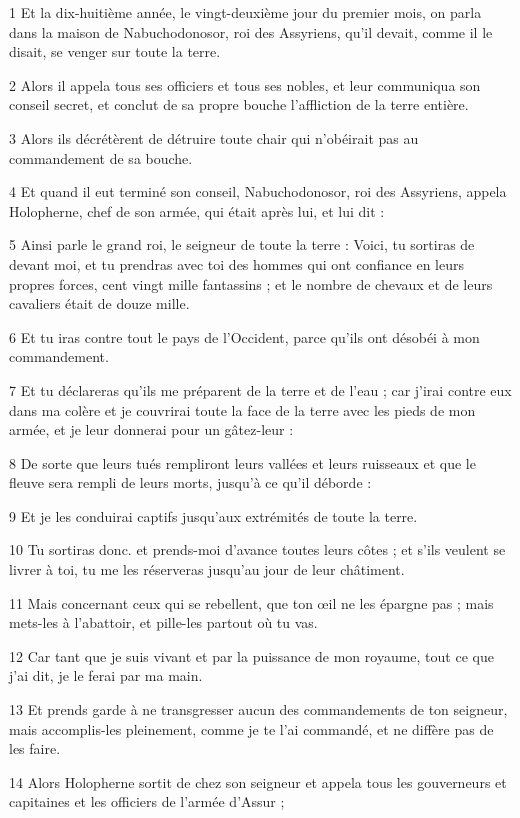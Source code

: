 \par 1 Et la dix-huitième année, le vingt-deuxième jour du premier mois, on parla dans la maison de Nabuchodonosor, roi des Assyriens, qu'il devait, comme il le disait, se venger sur toute la terre.
\par 2 Alors il appela tous ses officiers et tous ses nobles, et leur communiqua son conseil secret, et conclut de sa propre bouche l'affliction de la terre entière.
\par 3 Alors ils décrétèrent de détruire toute chair qui n'obéirait pas au commandement de sa bouche.
\par 4 Et quand il eut terminé son conseil, Nabuchodonosor, roi des Assyriens, appela Holopherne, chef de son armée, qui était après lui, et lui dit :
\par 5 Ainsi parle le grand roi, le seigneur de toute la terre : Voici, tu sortiras de devant moi, et tu prendras avec toi des hommes qui ont confiance en leurs propres forces, cent vingt mille fantassins ; et le nombre de chevaux et de leurs cavaliers était de douze mille.
\par 6 Et tu iras contre tout le pays de l'Occident, parce qu'ils ont désobéi à mon commandement.
\par 7 Et tu déclareras qu'ils me préparent de la terre et de l'eau ; car j'irai contre eux dans ma colère et je couvrirai toute la face de la terre avec les pieds de mon armée, et je leur donnerai pour un gâtez-leur :
\par 8 De sorte que leurs tués rempliront leurs vallées et leurs ruisseaux et que le fleuve sera rempli de leurs morts, jusqu'à ce qu'il déborde :
\par 9 Et je les conduirai captifs jusqu'aux extrémités de toute la terre.
\par 10 Tu sortiras donc. et prends-moi d'avance toutes leurs côtes ; et s'ils veulent se livrer à toi, tu me les réserveras jusqu'au jour de leur châtiment.
\par 11 Mais concernant ceux qui se rebellent, que ton œil ne les épargne pas ; mais mets-les à l'abattoir, et pille-les partout où tu vas.
\par 12 Car tant que je suis vivant et par la puissance de mon royaume, tout ce que j'ai dit, je le ferai par ma main.
\par 13 Et prends garde à ne transgresser aucun des commandements de ton seigneur, mais accomplis-les pleinement, comme je te l'ai commandé, et ne diffère pas de les faire.
\par 14 Alors Holopherne sortit de chez son seigneur et appela tous les gouverneurs et capitaines et les officiers de l'armée d'Assur ;
